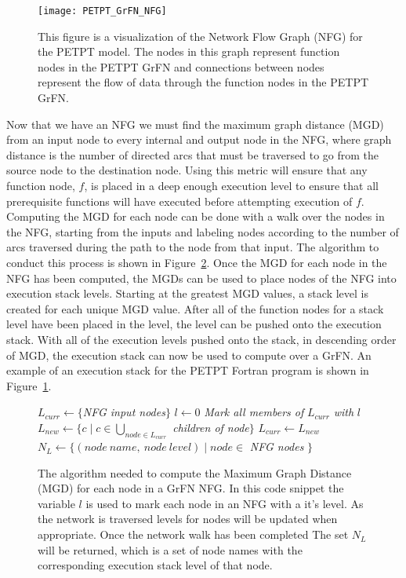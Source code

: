 \begin{figure}[!htbp]
    \label{fig:petpt_nfg}
    \centering
    \texttt{[image: PETPT\_GrFN\_NFG]}%
    \caption[PETPT GrFN Network Flow Graph]{This figure is a visualization of the Network Flow Graph (NFG) for the PETPT model. The nodes in this graph represent function nodes in the PETPT GrFN and connections between nodes represent the flow of data through the function nodes in the PETPT GrFN.}
\end{figure}

Now that we have an NFG we must find the maximum graph distance (MGD) from an input node to every internal and output node in the NFG, where graph distance is the number of directed arcs that must be traversed to go from the source node to the destination node.
Using this metric will ensure that any function node, $f$, is placed in a deep enough execution level to ensure that all prerequisite functions will have executed before attempting execution of $f$.
Computing the MGD for each node can be done with a walk over the nodes in the NFG, starting from the inputs and labeling nodes according to the number of arcs traversed during the path to the node from that input.
The algorithm to conduct this process is shown in Figure~\ref{fig:mgd_algorithm}.
Once the MGD for each node in the NFG has been computed, the MGDs can be used to place nodes of the NFG into execution stack levels.
Starting at the greatest MGD values, a stack level is created for each unique MGD value.
After all of the function nodes for a stack level have been placed in the level, the level can be pushed onto the execution stack.
With all of the execution levels pushed onto the stack, in descending order of MGD, the execution stack can now be used to compute over a GrFN.
An example of an execution stack for the PETPT Fortran program is shown in Figure~\ref{fig:petpt_nfg}.

\begin{figure}
  \begin{algorithmic}
    \State $L_{curr} \gets \{$\textit{NFG input nodes}$\}$
    \State $l \gets 0$
    	\State \textit{Mark all members of} $L_{curr}$ \textit{with} $l$
    	\State $L_{new} \gets \{ c \mid c \in \bigcup\limits_{node \in L_{curr}}$ \textit{children of node}$\}$
      \State $L_{curr} \gets L_{new}$
    \EndWhile
    \State \Return $N_L \gets \{(node~name,~node~level) \mid node \in$ \textit{NFG nodes} $\}$
  \end{algorithmic}
  \caption[MGD Labeling Algorithm]{The algorithm needed to compute the Maximum Graph Distance (MGD) for each node in a GrFN NFG. In this code snippet the variable $l$ is used to mark each node in an NFG with a it's level. As the network is traversed levels for nodes will be updated when appropriate. Once the network walk has been completed The set $N_L$ will be returned, which is a set of node names with the corresponding execution stack level of that node.}
  \label{fig:mgd_algorithm}
\end{figure}

